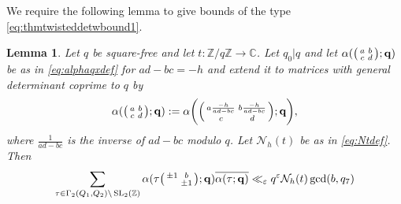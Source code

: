 \documentclass[12pt]{amsart}
\newtheorem{lemma}[theorem]{Lemma}
\theoremstyle{definition}
\theoremstyle{remark}
\numberwithin{equation}{section}
\newcommand{\C}{{\mathbb C}}
\newcommand{\Z}{{\mathbb Z}}
\newcommand{\1}{{\mathbf 1}}
\newcommand{\eps}{\varepsilon}
\newcommand{\SL}{\operatorname{SL}_2}
\renewcommand{\c}{\mathfrak c}
\begin{document}
We require the following lemma to give bounds of the type \eqref{eq:thmtwisteddetwbound1}.
\begin{lemma} \label{le:balancedlemma}
    Let $q$ be square-free and let $t:\Z/q\Z \to \C$. Let $q_0 | q$ and let $ \alpha(\smqty(a & b \\c & d); \mathbf{q})$ be as in \eqref{eq:alphaqxdef} for $ad-bc=-h$ and extend it to matrices with general determinant coprime to $q$ by
    \begin{align*}
        \alpha(\smqty(a & b \\c & d); \mathbf{q}) :=  \alpha\bigg(\smqty(a \frac{-h}{ad-bc} & b \frac{-h}{ad-bc}  \\c& d); \mathbf{q} \bigg),
    \end{align*}
    where $\frac{1}{ad-bc}$ is the inverse of $ad-bc$ modulo $q$.  Let $\mathcal{N}_h(t)$ be as in \eqref{eq:Ntdef}.  Then
    \begin{align*}
   \sum_{\tau \in \Gamma_2(Q_1,Q_2) \backslash \SL(\Z)} \alpha(\tau \smqty(\pm 1& b \\  & \pm 1); \mathbf{q}) \overline{\alpha (\tau; \mathbf{q})}  \ll_\eps q^\eps  \mathcal{N}_h(t) \gcd(b,q_7)
\end{align*}
\end{lemma}
\end{document}
